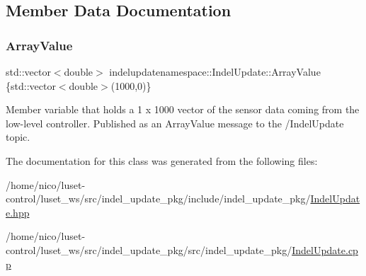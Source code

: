 \subsection{Member Data Documentation}
\mbox{\label{classindelupdatenamespace_1_1IndelUpdate_adb07f7b8d3c6aa7bde3e1d9c78aeb0d9}} 
\subsubsection{\texorpdfstring{Array\+Value}{ArrayValue}}
{\footnotesize\ttfamily std\+::vector$<$double$>$ indelupdatenamespace\+::\+Indel\+Update\+::\+Array\+Value \{std\+::vector$<$double$>$(1000,0)\}}



Member variable that holds a 1 x 1000 vector of the sensor data coming from the low-\/level controller. Published as an Array\+Value message to the /\+Indel\+Update topic. 



The documentation for this class was generated from the following files\+:\begin{DoxyCompactItemize}
\item 
/home/nico/luset-\/control/luset\+\_\+ws/src/indel\+\_\+update\+\_\+pkg/include/indel\+\_\+update\+\_\+pkg/\hyperlink{IndelUpdate_8hpp}{Indel\+Update.\+hpp}\item 
/home/nico/luset-\/control/luset\+\_\+ws/src/indel\+\_\+update\+\_\+pkg/src/indel\+\_\+update\+\_\+pkg/\hyperlink{IndelUpdate_8cpp}{Indel\+Update.\+cpp}\end{DoxyCompactItemize}
